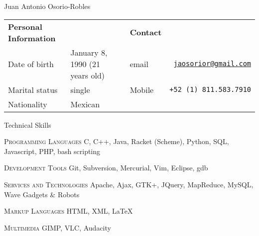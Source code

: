 \documentclass[spanish,10pt,letterpaper]{article}
\begin{document}
\centering
\begin{cv}{Juan Antonio Osorio-Robles}


	\begin{table}[h]
		\begin{tabular}{@{} l l p{0.5cm} l r}
			{\bf Personal Information}	&	&	&	{\bf Contact}	&	\\
			Date of birth &	January 8, 1990 (21 years old)	&	&
			email	&	\href{mailto:jaosorior@gmail.com}	{\tt jaosorior@gmail.com}	\\
			Marital status&	single &	&
			Mobile &	{\tt +52~(1)~811.583.7910}	\\
			Nationality &	Mexican		&	&
		\end{tabular}
	\end{table}
	
	\begin{cvlist}{Technical Skills}
			\item [\textsc{Programming Languages}]
				C, C++, Java, Racket (Scheme), Python, SQL, Javascript, PHP, bash scripting
			\item [\textsc{Development Tools}]
				Git, Subversion, Mercurial, Vim, Eclipse, gdb
			\item [\textsc {Services and Technologies}]
				Apache, Ajax, GTK+, JQuery, MapReduce, MySQL, Wave Gadgets \& Robots
			\item [\textsc {Markup Languages}]
				HTML, XML,
				\LaTeX
			\item [\textsc {Multimedia}]
				GIMP, VLC, Audacity
	\end{cvlist}


\end{cv}
\end{document}
